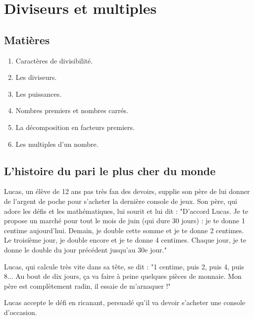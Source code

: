 \documentclass[../../syllabus_1.tex]{subfiles}
\begin{document}
\chapter{Diviseurs et multiples}

\section*{Matières}
\begin{enumerate}[label=\textbf{\arabic*.}]
      \item Caractères de divisibilité.
      \item Les diviseurs.
      \item Les puissances.
      \item Nombres premiers et nombres carrés.
      \item La décomposition en facteurs premiers.
      \item Les multiples d'un nombre.
\end{enumerate}

\section{L'histoire du pari le plus cher du monde}
Lucas, un élève de 12 ans pas très fan des devoirs, supplie son père de lui donner de l'argent de poche pour s'acheter la dernière console de jeux.
Son père, qui adore les défis et les mathématiques, lui sourit et lui dit : "D'accord Lucas. Je te propose un marché pour tout le mois de juin (qui dure 30 jours) :  je te donne 1 centime aujourd'hui. Demain, je double cette somme et je te donne 2 centimes. 
Le troisième jour, je double encore et je te donne 4 centimes. 
Chaque jour, je te donne le double du jour précédent jusqu'au 30e jour."

Lucas, qui calcule très vite dans sa tête, se dit : "1 centime, puis 2, puis 4, puis 8... Au bout de dix jours, ça va faire à peine quelques pièces de monnaie. Mon père est complètement radin, il essaie de m'arnaquer !"

Lucas accepte le défi en ricanant, persuadé qu'il va devoir s'acheter une console d'occasion.
\end{document}
